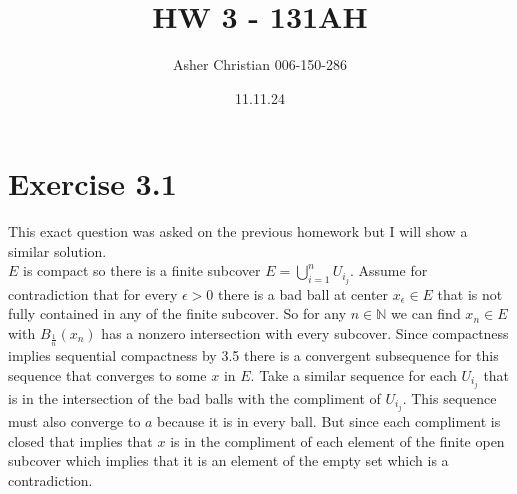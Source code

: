 \documentclass{amsart}
\title{HW 3 - 131AH}
\author{Asher Christian 006-150-286}
\date{11.11.24}
\begin{document}
    \maketitle
    \section*{Exercise 3.1}
    This exact question was asked on the previous homework but I will show a similar solution.
    \\
    $E$ is compact so there is a finite subcover $E = \bigcup_{i=1}^{n}U_{i_j}$. Assume for contradiction that for every $\epsilon > 0$ there is a bad ball
    at center $x_\epsilon \in E$ that is not fully contained in any of the finite subcover. So for any $n \in \mathbb{N} $ we can find $x_n \in E$ with $B_{\frac{1}{n}}(x_n)$ has a
    nonzero intersection with every subcover. Since compactness implies sequential compactness by 3.5 there is a convergent subsequence for this sequence that converges to some $x$ in $E$.
    Take a similar sequence for each $U_{i_j}$ that is in the intersection of the bad balls with the compliment of  $U_{i_j}$. This sequence must also converge to  $a$ because it is in every ball.
    But since each compliment is closed that implies that $x$ is in the compliment of each element of the finite open subcover which implies that it is an element of the empty set which is a contradiction.
    
    
\end{document}
